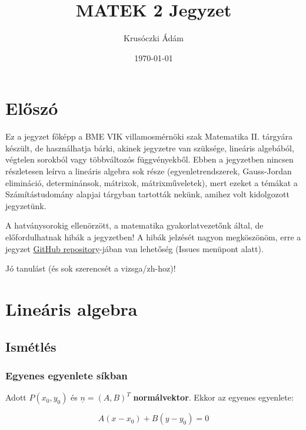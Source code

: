 \documentclass{article}
\title{MATEK 2 Jegyzet}
\author{Krusóczki Ádám}
\date{\today}
\begin{document}
\tableofcontents

\newpage

\maketitle


\section{Előszó}

Ez a jegyzet főképp a BME VIK villamosmérnöki szak Matematika II. tár\-gyá\-ra ké\-szült, de hasz\-nál\-hat\-ja bárki, 
akinek jegyzetre van szüksége, lineáris algebából, végtelen sorokból vagy többváltozós függvényekből. Ebben a jegyzetben nincsen részletesen
leírva a lineáris algebra sok része (egyenletrendszerek, Gauss-Jordan elimináció, determinánsok, mátrixok, mátrixműveletek), mert ezeket a témákat a Számítástudomány
alapjai tárgyban tartották nekünk, amihez volt kidolgozott jegyzetünk. 

\vspace{4mm}

A hatványsorokig ellenörzött, a matematika gyakorlatvezetőnk által, de e\-lő\-for\-dul\-hat\-nak hibák a jegyzetben! A hibák jelzését nagyon megköszönöm,
erre a jegyzet \href{https://github.com/krusoadi/tex_notes}{GitHub repository}-jában van lehetőség (Issues menüpont alatt). 

\vspace{4mm}

Jó tanulást (és sok szerencsét a vizsga/zh-hoz)!

\newpage

\section{Lineáris algebra}

\subsection{Ismétlés}

\subsubsection{Egyenes egyenlete síkban}
    Adott $P(x_0, y_0)$ és $\underline{n} = \left( A, B \right)^T$ \textbf{normálvektor}. Ekkor az egyenes egyenlete:

\begin{equation*}
    A(x-x_0) + B(y-y_0) = 0
\end{equation*}
\end{document}
